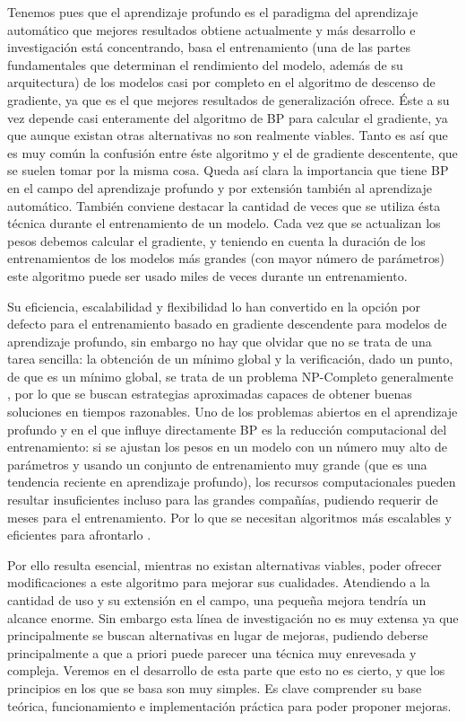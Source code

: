 Tenemos pues que el aprendizaje profundo es el paradigma del aprendizaje automático que mejores resultados obtiene actualmente y más desarrollo e investigación está concentrando, basa el entrenamiento (una de las partes fundamentales que determinan el rendimiento del modelo, además de su arquitectura) de los modelos casi por completo en el algoritmo de descenso de gradiente, ya que es el que mejores resultados de generalización ofrece. Éste a su vez depende casi enteramente del algoritmo de BP para calcular el gradiente, ya que aunque existan otras alternativas no son realmente viables. Tanto es así que es muy común la confusión entre éste algoritmo y el de gradiente descentente, que se suelen tomar por la misma cosa. Queda así clara la importancia que tiene BP en el campo del aprendizaje profundo y por extensión también al aprendizaje automático. También conviene destacar la cantidad de veces que se utiliza ésta técnica durante el entrenamiento de un modelo. Cada vez que se actualizan los pesos debemos calcular el gradiente, y teniendo en cuenta la duración de los entrenamientos de los modelos más grandes (con mayor número de parámetros) este algoritmo puede ser usado miles de veces durante un entrenamiento.

Su eficiencia, escalabilidad y flexibilidad lo han convertido en la opción por defecto para el entrenamiento basado en gradiente descendente para modelos de aprendizaje profundo, sin embargo no hay que olvidar que no se trata de una tarea sencilla: la obtención de un mínimo global y la verificación, dado un punto, de que es un mínimo global, se trata de un problema NP-Completo generalmente \cite{NPHardProblem}, por lo que se buscan estrategias aproximadas capaces de obtener buenas soluciones en tiempos razonables. Uno de los problemas abiertos en el aprendizaje profundo y en el que influye directamente BP es la reducción computacional del entrenamiento: si se ajustan los pesos en un modelo con un número muy alto de parámetros y usando un conjunto de entrenamiento muy grande (que es una tendencia reciente en aprendizaje profundo), los recursos computacionales pueden resultar insuficientes incluso para las grandes compañías, pudiendo requerir de meses para el  entrenamiento. Por lo que se necesitan algoritmos más escalables y eficientes para afrontarlo \cite{Problem3_accel}.

Por ello resulta esencial, mientras no existan alternativas viables, poder ofrecer modificaciones a este algoritmo para mejorar sus cualidades. Atendiendo a la cantidad de uso y su extensión en el campo, una pequeña mejora tendría un alcance enorme. Sin embargo esta línea de investigación no es muy extensa ya que principalmente se buscan alternativas en lugar de mejoras, pudiendo deberse principalmente a que a priori puede parecer una técnica muy enrevesada y compleja. Veremos en el desarrollo de esta parte que esto no es cierto, y que los principios en los que se basa son muy simples. Es clave comprender su base teórica, funcionamiento e implementación práctica para poder proponer mejoras. 


